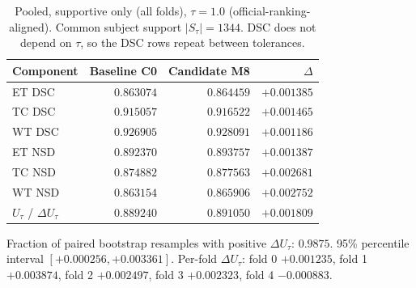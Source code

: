 \documentclass[runningheads]{llncs}
\begin{document}
\begin{table}[htbp]\centering
\caption{Pooled, supportive only (all folds), $\tau=1.0$ (official-ranking-aligned). Common subject support $|S_\tau|=1344$. DSC does not
depend on $\tau$, so the DSC rows repeat between tolerances.}
\begin{tabular}{@{}lrrr@{}}
\toprule
Component & Baseline C0 & Candidate M8 & $\Delta$ \\
\midrule
ET DSC & $0.863074$ & $0.864459$ & $+0.001385$ \\
TC DSC & $0.915057$ & $0.916522$ & $+0.001465$ \\
WT DSC & $0.926905$ & $0.928091$ & $+0.001186$ \\
ET NSD & $0.892370$ & $0.893757$ & $+0.001387$ \\
TC NSD & $0.874882$ & $0.877563$ & $+0.002681$ \\
WT NSD & $0.863154$ & $0.865906$ & $+0.002752$ \\
\midrule
$U_\tau$ / $\Delta U_\tau$ & $0.889240$ & $0.891050$ & $+0.001809$ \\
\bottomrule
\end{tabular}
\par\medskip
\begin{minipage}{0.92\textwidth}\small Fraction of paired bootstrap resamples with positive $\Delta U_\tau$: $0.9875$. 95\% percentile interval $[+0.000256,+0.003361]$. Per-fold $\Delta U_\tau$: fold 0 $+0.001235$, fold 1 $+0.003874$, fold 2 $+0.002497$, fold 3 $+0.002323$, fold 4 $-0.000883$.\end{minipage}
\end{table}
\end{document}
